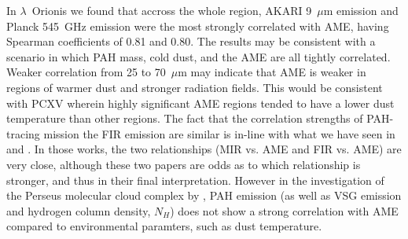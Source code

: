       In  $\lambda$~Orionis we found that accross the whole region, AKARI 9~$\mu$m emission and Planck 545~GHz emission were the most strongly correlated with AME, having Spearman coefficients of 0.81 and 0.80. The results may be consistent with a scenario in which PAH mass, cold dust, and the AME are all tightly correlated. Weaker correlation from 25 to 70~$\mu$m may indicate that AME is weaker in regions of warmer dust and stronger radiation fields. This would be consistent with PCXV wherein highly significant AME regions tended to have a lower dust temperature than other regions. The fact that the correlation strengths of PAH-tracing mission the FIR emission are similar is in-line with what we have seen in \cite{ysard10b} and \cite{hensley16}. In those works, the two relationships (MIR vs. AME and FIR vs. AME) are very close, although these two papers are odds as to which relationship is stronger, and thus in their final interpretation. However in the investigation of the Perseus molecular cloud complex by \cite{tibbs11}, PAH emission (as well as VSG emission and hydrogen column density, $N_{H}$) does not show a strong correlation with AME compared to environmental paramters, such as dust temperature.

